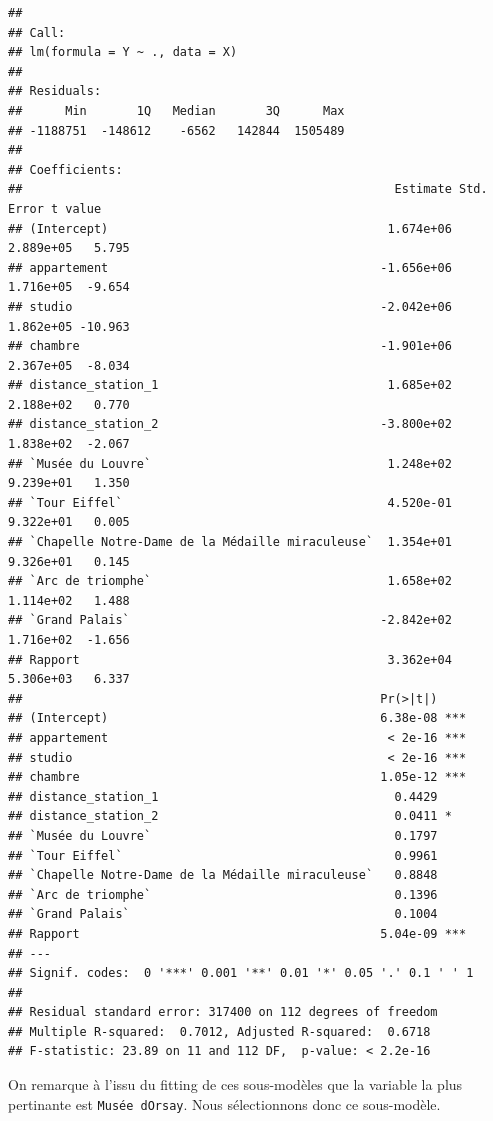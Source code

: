 \documentclass[french,]{article}
\begin{document}
\begin{verbatim}
## 
## Call:
## lm(formula = Y ~ ., data = X)
## 
## Residuals:
##      Min       1Q   Median       3Q      Max 
## -1188751  -148612    -6562   142844  1505489 
## 
## Coefficients:
##                                                    Estimate Std. Error t value
## (Intercept)                                       1.674e+06  2.889e+05   5.795
## appartement                                      -1.656e+06  1.716e+05  -9.654
## studio                                           -2.042e+06  1.862e+05 -10.963
## chambre                                          -1.901e+06  2.367e+05  -8.034
## distance_station_1                                1.685e+02  2.188e+02   0.770
## distance_station_2                               -3.800e+02  1.838e+02  -2.067
## `Musée du Louvre`                                 1.248e+02  9.239e+01   1.350
## `Tour Eiffel`                                     4.520e-01  9.322e+01   0.005
## `Chapelle Notre-Dame de la Médaille miraculeuse`  1.354e+01  9.326e+01   0.145
## `Arc de triomphe`                                 1.658e+02  1.114e+02   1.488
## `Grand Palais`                                   -2.842e+02  1.716e+02  -1.656
## Rapport                                           3.362e+04  5.306e+03   6.337
##                                                  Pr(>|t|)    
## (Intercept)                                      6.38e-08 ***
## appartement                                       < 2e-16 ***
## studio                                            < 2e-16 ***
## chambre                                          1.05e-12 ***
## distance_station_1                                 0.4429    
## distance_station_2                                 0.0411 *  
## `Musée du Louvre`                                  0.1797    
## `Tour Eiffel`                                      0.9961    
## `Chapelle Notre-Dame de la Médaille miraculeuse`   0.8848    
## `Arc de triomphe`                                  0.1396    
## `Grand Palais`                                     0.1004    
## Rapport                                          5.04e-09 ***
## ---
## Signif. codes:  0 '***' 0.001 '**' 0.01 '*' 0.05 '.' 0.1 ' ' 1
## 
## Residual standard error: 317400 on 112 degrees of freedom
## Multiple R-squared:  0.7012, Adjusted R-squared:  0.6718 
## F-statistic: 23.89 on 11 and 112 DF,  p-value: < 2.2e-16
\end{verbatim}

On remarque à l'issu du fitting de ces sous-modèles que la variable la
plus pertinante est \texttt{Musée\ d\textquotesingle{}Orsay}. Nous
sélectionnons donc ce sous-modèle.
\end{document}
